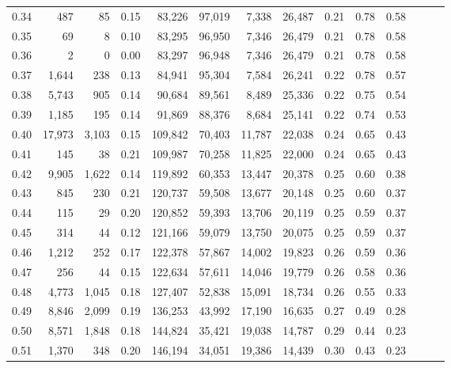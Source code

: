 \begin{tabular}{rrrrrrrrrrrrrr}
0.34 &     487 &     85 &  0.15 &   83,226 &   97,019 &   7,338 &  26,487 &  0.21 &  0.78 &      0.58 \\
0.35 &      69 &      8 &  0.10 &   83,295 &   96,950 &   7,346 &  26,479 &  0.21 &  0.78 &      0.58 \\
0.36 &       2 &      0 &  0.00 &   83,297 &   96,948 &   7,346 &  26,479 &  0.21 &  0.78 &      0.58 \\
0.37 &   1,644 &    238 &  0.13 &   84,941 &   95,304 &   7,584 &  26,241 &  0.22 &  0.78 &      0.57 \\
0.38 &   5,743 &    905 &  0.14 &   90,684 &   89,561 &   8,489 &  25,336 &  0.22 &  0.75 &      0.54 \\
0.39 &   1,185 &    195 &  0.14 &   91,869 &   88,376 &   8,684 &  25,141 &  0.22 &  0.74 &      0.53 \\
0.40 &  17,973 &  3,103 &  0.15 &  109,842 &   70,403 &  11,787 &  22,038 &  0.24 &  0.65 &      0.43 \\
0.41 &     145 &     38 &  0.21 &  109,987 &   70,258 &  11,825 &  22,000 &  0.24 &  0.65 &      0.43 \\
0.42 &   9,905 &  1,622 &  0.14 &  119,892 &   60,353 &  13,447 &  20,378 &  0.25 &  0.60 &      0.38 \\
0.43 &     845 &    230 &  0.21 &  120,737 &   59,508 &  13,677 &  20,148 &  0.25 &  0.60 &      0.37 \\
0.44 &     115 &     29 &  0.20 &  120,852 &   59,393 &  13,706 &  20,119 &  0.25 &  0.59 &      0.37 \\
0.45 &     314 &     44 &  0.12 &  121,166 &   59,079 &  13,750 &  20,075 &  0.25 &  0.59 &      0.37 \\
0.46 &   1,212 &    252 &  0.17 &  122,378 &   57,867 &  14,002 &  19,823 &  0.26 &  0.59 &      0.36 \\
0.47 &     256 &     44 &  0.15 &  122,634 &   57,611 &  14,046 &  19,779 &  0.26 &  0.58 &      0.36 \\
0.48 &   4,773 &  1,045 &  0.18 &  127,407 &   52,838 &  15,091 &  18,734 &  0.26 &  0.55 &      0.33 \\
0.49 &   8,846 &  2,099 &  0.19 &  136,253 &   43,992 &  17,190 &  16,635 &  0.27 &  0.49 &      0.28 \\
0.50 &   8,571 &  1,848 &  0.18 &  144,824 &   35,421 &  19,038 &  14,787 &  0.29 &  0.44 &      0.23 \\
0.51 &   1,370 &    348 &  0.20 &  146,194 &   34,051 &  19,386 &  14,439 &  0.30 &  0.43 &      0.23 \\

\end{tabular}
